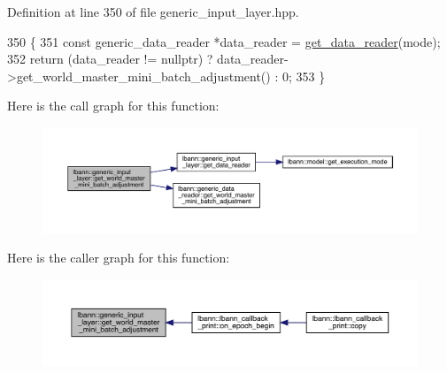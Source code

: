 Definition at line 350 of file generic\+\_\+input\+\_\+layer.\+hpp.


\begin{DoxyCode}
350                                                                                 \{
351     \textcolor{keyword}{const} generic\_data\_reader *data\_reader = \hyperlink{classlbann_1_1generic__input__layer_aba732becdb02627e3ad4493ac19e8fb6}{get\_data\_reader}(mode);
352     \textcolor{keywordflow}{return} (data\_reader != \textcolor{keyword}{nullptr}) ? data\_reader->get\_world\_master\_mini\_batch\_adjustment() : 0;
353   \}
\end{DoxyCode}
Here is the call graph for this function\+:\nopagebreak
\begin{figure}[H]
\begin{center}
\leavevmode
\includegraphics[width=350pt]{classlbann_1_1generic__input__layer_a1c2a503d4009b6360d96db128796983c_cgraph}
\end{center}
\end{figure}
Here is the caller graph for this function\+:\nopagebreak
\begin{figure}[H]
\begin{center}
\leavevmode
\includegraphics[width=350pt]{classlbann_1_1generic__input__layer_a1c2a503d4009b6360d96db128796983c_icgraph}
\end{center}
\end{figure}
\mbox{\label{classlbann_1_1generic__input__layer_a111abcde5f53746dfd6c5fe18187ee57}} 
